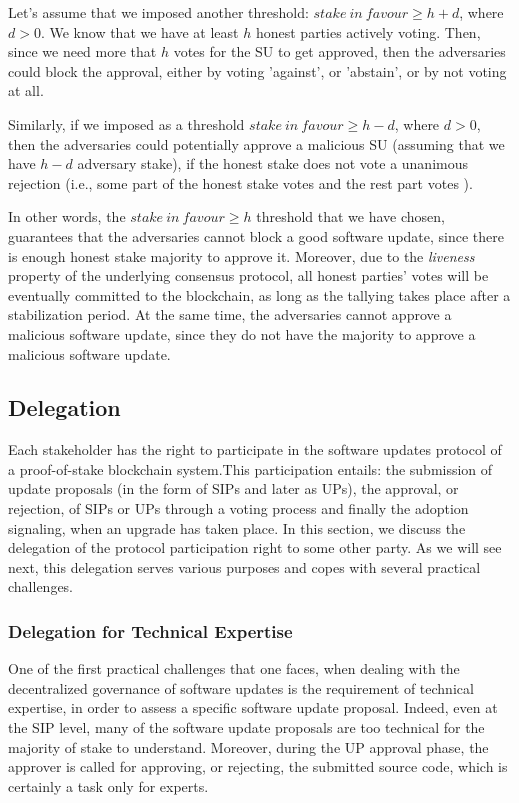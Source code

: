 Let's assume that we imposed another threshold: 
$stake\ in\ favour \geq h + d$, where $d > 0$. We know that we have at least $h$ honest parties actively voting. Then, since we need more that $h$ votes for the SU to get approved, then the adversaries could block the approval, either by voting 'against', or 'abstain', or by not voting at all.

Similarly, if we imposed as a threshold $stake\ in\ favour \geq h - d$, where $d > 0$, then the adversaries could potentially approve a malicious SU (assuming that we have $h-d$ adversary stake), if the honest stake does not vote a unanimous rejection (i.e., some part of the honest stake votes  and the rest part votes ). 

In other words, the  $stake\ in\ favour \geq h$ threshold that we have chosen, guarantees that the adversaries cannot block a good software update, since there is enough honest stake majority to approve it. Moreover, due to the \emph{liveness} property of the underlying consensus protocol, all honest parties' votes will be eventually committed to the blockchain, as long as the tallying takes place after a stabilization period. At the same time, the adversaries cannot approve a malicious software update, since they do not have the majority to approve a malicious software update.

\subsection{Delegation}
Each stakeholder has the right to participate in the software updates protocol of a proof-of-stake blockchain system.This participation entails: the submission of update proposals (in the form of SIPs and later as UPs), the approval, or rejection, of SIPs or UPs through a voting process and finally the adoption signaling, when an upgrade has taken place. In this section, we discuss the delegation of the protocol participation right to some other party. As we will see next, this delegation serves various purposes and copes with several practical challenges.
\subsubsection{Delegation for Technical Expertise}\label{delfortech}
One of the first practical challenges that one faces, when dealing with the decentralized governance of software updates is the requirement of technical expertise, in order to assess a specific software update proposal. Indeed, even at the SIP level, many of the software update proposals are too technical for the majority of stake to understand. Moreover, during the UP approval phase, the approver is called for approving, or rejecting, the submitted source code, which is certainly a task only for experts.

